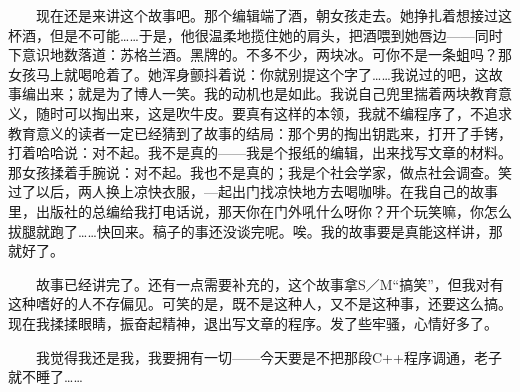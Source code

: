 　　现在还是来讲这个故事吧。那个编辑端了酒，朝女孩走去。她挣扎着想接过这杯酒，但是不可能……于是，他很温柔地揽住她的肩头，把酒喂到她唇边——同时下意识地数落道：苏格兰酒。黑牌的。不多不少，两块冰。可你不是一条蛆吗？那女孩马上就喝呛着了。她浑身颤抖着说：你就别提这个字了……我说过的吧，这故事编出来；就是为了博人一笑。我的动机也是如此。我说自己兜里揣着两块教育意义，随时可以掏出来，这是吹牛皮。要真有这样的本领，我就不编程序了，不追求教育意义的读者一定已经猜到了故事的结局：那个男的掏出钥匙来，打开了手铐，打着哈哈说：对不起。我不是真的——我是个报纸的编辑，出来找写文章的材料。那女孩揉着手腕说：对不起。我也不是真的；我是个社会学家，做点社会调查。笑过了以后，两人换上凉快衣服，—起出门找凉快地方去喝咖啡。在我自己的故事里，出版社的总编给我打电话说，那天你在门外吼什么呀你？开个玩笑嘛，你怎么拔腿就跑了……快回来。稿子的事还没谈完呢。唉。我的故事要是真能这样讲，那就好了。 

　　故事已经讲完了。还有一点需要补充的，这个故事拿S／M“搞笑”，但我对有这种嗜好的人不存偏见。可笑的是，既不是这种人，又不是这种事，还要这么搞。现在我揉揉眼睛，振奋起精神，退出写文章的程序。发了些牢骚，心情好多了。 

　　我觉得我还是我，我要拥有一切——今天要是不把那段C++程序调通，老子就不睡了…… 

　
